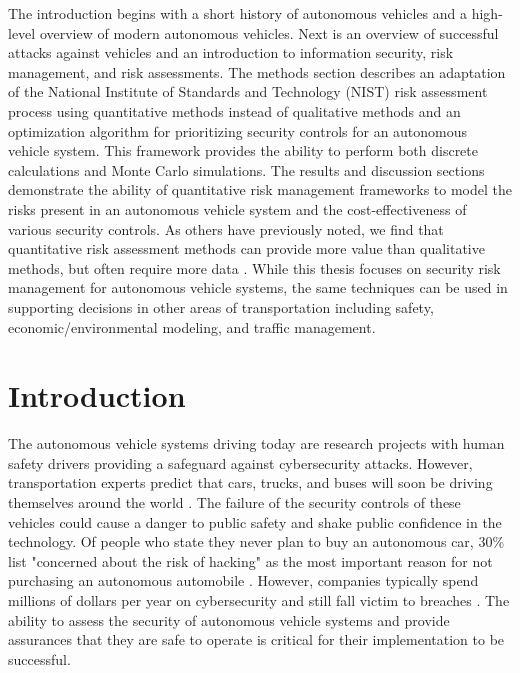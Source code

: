 \documentclass{article}
\begin{document}
The introduction begins with a short history of autonomous vehicles and a high-level overview of modern autonomous vehicles. Next is an overview of successful attacks against vehicles and an introduction to information security, risk management, and risk assessments. The methods section describes an adaptation of the National Institute of Standards and Technology (NIST) risk assessment process using quantitative methods instead of qualitative methods and an optimization algorithm for prioritizing security controls for an autonomous vehicle system. This framework provides the ability to perform both discrete calculations and Monte Carlo simulations. The results and discussion sections demonstrate the ability of quantitative risk management frameworks to model the risks present in an autonomous vehicle system and the cost-effectiveness of various security controls. As others have previously noted, we find that quantitative risk assessment methods can provide more value than qualitative methods, but often require more data \citep{national_institute_of_standards_and_technology_nist_2012}. While this thesis focuses on security risk management for autonomous vehicle systems, the same techniques can be used in supporting decisions in other areas of transportation including safety, economic/environmental modeling, and traffic management.

\newpage
\section{Introduction}
The autonomous vehicle systems driving today are research projects with human safety drivers providing a safeguard against cybersecurity attacks. However, transportation experts predict that cars, trucks, and buses will soon be driving themselves around the world \citep{littman_autonomous_2018, kockelman_implications_2016}. The failure of the security controls of these vehicles could cause a danger to public safety and shake public confidence in the technology. Of people who state they never plan to buy an autonomous car, 30\% list "concerned about the risk of hacking" as the most important reason for not purchasing an autonomous automobile \citep{ponemon_will_2017}. However, companies typically spend millions of dollars per year on cybersecurity and still fall victim to breaches \citep{richards_2017_2017}. The ability to assess the security of autonomous vehicle systems and provide assurances that they are safe to operate is critical for their implementation to be successful.
\end{document}
